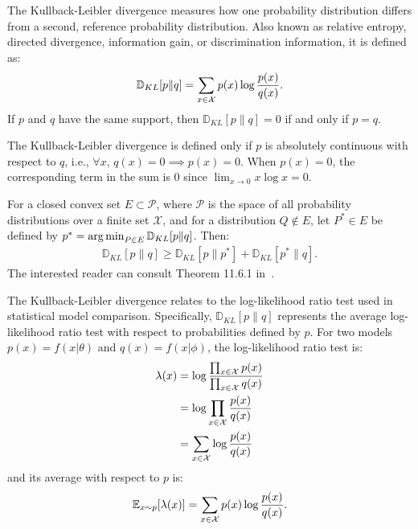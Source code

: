 \begin{definition}%
	\label{def:kl-divergence}
	The \textnormal{\sffamily Kullback-Leibler divergence} measures how
	one probability distribution differs from a second, reference probability distribution.
	Also known as \textnormal{\sffamily relative entropy}, \textnormal{\sffamily directed divergence},
	\textnormal{\sffamily information gain}, or \textnormal{\sffamily
		discrimination information}, it is defined as:
	\begin{align}
		\label{eq:KL}
		\mathbb{D}_{KL}[p \| q] = \sum_{x \in \mathcal{X}} p(x) \log{p(x) \over q(x)}.
	\end{align}
	If $p$ and $q$ have the same support, then $\mathbb{D}_{KL}[p \| q] = 0$ if and
	only if $p = q$.
\end{definition}

\begin{remark}
	The Kullback-Leibler divergence is defined only if $p$ is absolutely
	continuous with respect to $q$, i.e., $\forall x$,
	$q(x) = 0 \implies p(x) = 0$. When $p(x) = 0$, the corresponding term in the sum is 0 since $\lim_{x \to 0} x\log{x} = 0$.
\end{remark}

\begin{theorem}
	For a closed convex set $E \subset \mathcal{P}$, where $\mathcal{P}$ is the space of
	all probability distributions over a finite set $\mathcal{X}$, and for a
	distribution $Q \not \in E$, let $P^* \in E$ be defined by
	$p^* = \operatorname*{arg\,min}_{P \in E} \mathbb{D}_{KL}[p \| q]$. Then:
	\begin{align}
		\mathbb{D}_{KL}[p \| q] \geq \mathbb{D}_{KL}[p \| p^*] + \mathbb{D}_{KL}[p^* \| q].
	\end{align}
	The interested reader can consult Theorem 11.6.1 in~\cite{ref:cover-thomas}.
\end{theorem}

\begin{remark}
	The Kullback-Leibler divergence relates to the log-likelihood ratio test used in statistical model comparison. Specifically, $\mathbb{D}_{KL}[p \| q]$ represents the average log-likelihood ratio test with respect to probabilities defined by $p$. For two models $p(x) = f(x|\theta)$ and $q(x) = f(x|\phi)$, the log-likelihood ratio test is:
	\begin{align}
		\lambda(x) & = \log{\prod_{x \in \mathcal{X}} p(x) \over \prod_{x \in \mathcal{X}} q(x)} \\
		           & = \log \prod_{x \in \mathcal{X}} {p(x) \over q(x)}                          \\
		           & = \sum_{x \in \mathcal{X}} \log {p(x) \over q(x)}
	\end{align}
	and its average with respect to $p$ is:
	\begin{align}
		\mathbb{E}_{x \sim p}[\lambda(x)] = \sum_{x \in \mathcal{X}} p(x)\log {p(x) \over q(x)}.
	\end{align}
\end{remark}


